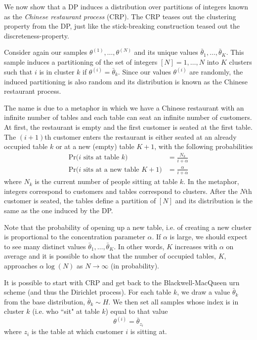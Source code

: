 \documentclass[final,3p,times,twocolumn]{elsarticle}
\begin{document}
We now show that a DP induces a distribution over partitions of integers known as the \emph{Chinese restaurant process} (CRP).
The CRP teases out the clustering property from the DP, just like the stick-breaking construction teased out the discreteness-property.

Consider again our samples $\theta^{(1)},\dots,\theta^{(N)}$ and its unique values $\bar \theta_1,\dots,\bar \theta_K$.
This sample induces a partitioning of the set of integers $[N] = {1,\dots,N}$ into $K$ clusters such that $i$ is in cluster $k$ if $\theta^{(i)} = \bar \theta_k$.
Since our values $\theta^{(i)}$ are randomly, the induced partitioning is also random and its distribution is known as the Chinese restaurant process.

The name is due to a metaphor in which we have a Chinese restaurant with an infinite number of tables and each table can seat an infinite number of customers.
At first, the restaurant is empty and the first customer is seated at the first table. 
The $(i+1)$th customer enters the restaurant is either seated at an already occupied table $k$ or at a new (empty) table $K+1$, with the following probabilities
\begin{equation}
\label{eqn:crp}
\begin{split}
\mbox{Pr($i$ sits at table $k$)} &= \frac{N_k}{i+\alpha}\\
\mbox{Pr($i$ sits at a new table $K+1$)} &= \frac{\alpha}{i+\alpha}
\end{split}
\end{equation}
where $N_k$ is the current number of people sitting at table $k$.
In the metaphor, integers correspond to customers and tables correspond to clusters. 
After the $N$th customer is seated, the tables define a partition of $[N]$ and its distribution is the same as the one induced by the DP.

Note that the probability of opening up a new table, i.e. of creating a new cluster is proportional to the concentration parameter $\alpha$.
If $\alpha$ is large, we should expect to see many distinct values $\bar \theta_1,\dots,\bar \theta_K$.
In other words, $K$ increases with $\alpha$ on average and it is possible to show that the number of occupied tables, $K$, approaches $\alpha \log(N)$ as $N \rightarrow \infty$ (in probability).

It is possible to start with CRP and get back to the Blackwell-MacQueen urn scheme (and thus the Dirichlet process). 
For each table $k$, we draw a value $\bar \theta_k$ from the base distribution, $\bar \theta_k \sim H$.
We then set all samples whose index is in cluster $k$ (i.e. who ``sit" at table $k$) equal to that value
\begin{equation}
\theta^{(i)} = \bar \theta_{z_i}
\end{equation}
where $z_i$ is the table at which customer $i$ is sitting at.
\end{document}
